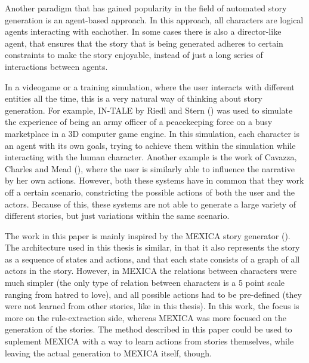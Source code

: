 Another paradigm that has gained popularity in the field of automated story
generation is an agent-based approach. In this approach, all characters are
logical agents interacting with eachother. In some cases there is also a
director-like agent, that ensures that the story that is being generated adheres
to certain constraints to make the story enjoyable, instead of just a long
series of interactions between agents.

In a videogame or a training simulation, where the user interacts with different
entities all the time, this is a very natural way of thinking about story
generation. For example, IN-TALE by Riedl and Stern (\cite{riedl2006believable})
was used to simulate the experience of being an army officer of a peacekeeping force
on a busy marketplace in a 3D computer game engine. In this simulation, each
character is an agent with its own goals, trying to achieve them within the
simulation while interacting with the human character. Another example is the
work of Cavazza, Charles and Mead (\cite{cavazza2002interacting}), where the
user is similarly able to influence the narrative by her own actions. However,
both these systems have in common that they work off a certain scenario,
constricting the possible actions of both the user and the actors. Because of
this, these systems are not able to generate a large variety of different
stories, but just variations within the same scenario.

The work in this paper is mainly inspired by the MEXICA story generator
(\cite{perez2001mexica}). %
The architecture used in this thesis is similar, in that it also represents the
story as a sequence of states and actions, and that each state consists of a
graph of all actors in the story.
However, in MEXICA the relations between characters were much simpler (the only
type of relation between characters is a 5 point scale ranging from hatred to
love), and 
all possible actions had to be pre-defined (they were not learned from other
stories, like in this thesis). In this work, the focus is more on
the rule-extraction side, whereas MEXICA was more focused on the generation of
the stories. The method described in this paper could be used to suplement
MEXICA with a way to learn actions from stories themselves, while leaving the
actual generation to MEXICA itself, though.
